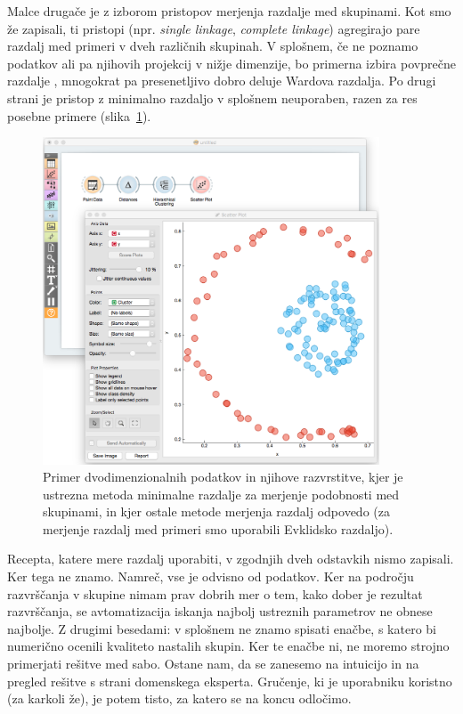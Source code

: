 Malce drugače je z izborom pristopov merjenja razdalje med skupinami. Kot smo že zapisali, ti pristopi (npr. {\em single linkage}, {\em complete linkage}) agregirajo pare razdalj med primeri v dveh različnih skupinah. V splošnem, če ne poznamo podatkov ali pa njihovih projekcij v nižje dimenzije, bo primerna izbira povprečne razdalje , mnogokrat pa presenetljivo dobro deluje Wardova razdalja. Po drugi strani je pristop z minimalno razdaljo  v splošnem neuporaben, razen za res posebne primere (slika~\ref{f-single-linkage}).

\begin{figure}[htbp]
\begin{center}
\includegraphics[width=10cm]{slike/single-linkage.png}
\caption{Primer dvodimenzionalnih podatkov in njihove razvrstitve, kjer je ustrezna metoda minimalne razdalje za merjenje podobnosti med skupinami, in kjer ostale metode merjenja razdalj odpovedo (za merjenje razdalj med primeri smo uporabili Evklidsko razdaljo).}
\label{f-single-linkage}
\end{center}
\end{figure}

Recepta, katere mere razdalj uporabiti, v zgodnjih dveh odstavkih nismo zapisali. Ker tega ne znamo. Namreč, vse je odvisno od podatkov. Ker na področju razvrščanja v skupine nimam prav dobrih mer o tem, kako dober je rezultat razvrščanja, se avtomatizacija iskanja najbolj ustreznih parametrov ne obnese najbolje. Z drugimi besedami: v splošnem ne znamo spisati enačbe, s katero bi numerično ocenili kvaliteto nastalih skupin. Ker te enačbe ni, ne moremo strojno primerjati rešitve med sabo. Ostane nam, da se zanesemo na intuicijo in na pregled rešitve s strani domenskega eksperta. Gručenje, ki je uporabniku koristno (za karkoli že), je potem tisto, za katero se na koncu odločimo.
